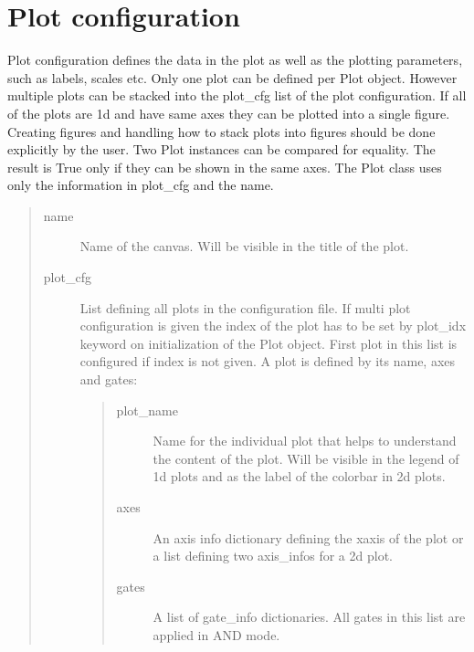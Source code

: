 \documentclass[letterpaper,10pt,english]{sphinxmanual}
\begin{document}
\section{Plot configuration}
\label{\detokenize{manual/configuration:plot-configuration}}
\sphinxAtStartPar
Plot configuration defines the data in the plot as well as the plotting parameters, such as labels, scales etc.
Only one plot can be defined per Plot object. However multiple plots can be stacked into the plot\_cfg list of the plot
configuration. If all of the plots are 1d and have same axes they can be plotted into a single figure. Creating figures
and handling how to stack plots into figures should be done explicitly by the user. Two Plot instances can be compared
for equality. The result is True only if they can be shown in the same axes. The Plot class uses only the information
in plot\_cfg and the name.
\begin{quote}\begin{description}
\item[{name}] \leavevmode
\sphinxAtStartPar
Name of the canvas. Will be visible in the title of the plot.

\item[{plot\_cfg}] \leavevmode
\sphinxAtStartPar
List defining all plots in the configuration file. If multi plot configuration is given the index of the
plot has to be set by plot\_idx keyword on initialization of the Plot object. First plot in this list is
configured if index is not given. A plot is defined by its name, axes and gates:
\begin{quote}\begin{description}
\item[{plot\_name}] \leavevmode
\sphinxAtStartPar
Name for the individual plot that helps to understand the content of the plot. Will be
visible in the legend of 1d plots and as the label of the colorbar in 2d plots.

\item[{axes}] \leavevmode
\sphinxAtStartPar
An axis info dictionary defining the x\sphinxhyphen{}axis of the plot or a list defining two
axis\_infos for a 2d plot.

\item[{gates}] \leavevmode
\sphinxAtStartPar
A list of gate\_info dictionaries. All gates in this list are applied in AND mode.

\end{description}\end{quote}

\end{description}\end{quote}
\end{document}
